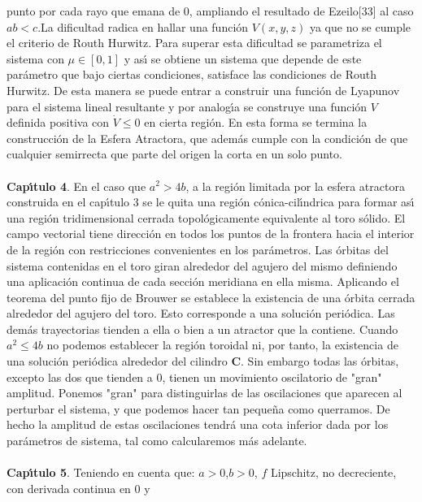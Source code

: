 \documentclass[letter]{article}
\begin{document}
punto por cada rayo que emana de 0, ampliando el resultado de
Ezeilo[33] al caso $ab<c$.La dificultad radica en hallar una
funci{\'o}n $V(x,y,z)$ ya que no se cumple el criterio de Routh
Hurwitz. Para superar esta dificultad se parametriza el sistema
con $\mu\in[0,1]$ y as{\'\i} se obtiene un sistema que depende de este
par{\'a}metro que bajo ciertas condiciones, satisface las condiciones
de Routh Hurwitz. De esta manera se puede entrar a construir una
funci{\'o}n de Lyapunov para el sistema lineal resultante y por
analog{\'\i}a se construye una funci{\'o}n $V$ definida positiva con
$\dot{V}\leq 0$ en cierta regi{\'o}n.  En esta forma  se termina la
construcci{\'o}n de la Esfera Atractora, que adem{\'a}s cumple con la
condici{\'o}n de que cualquier semirrecta que parte del origen la
corta en un solo punto.
\\
\\
{\bf Cap{\'\i}tulo 4}. En el caso que $a^2>4b$, a la regi{\'o}n limitada
por la esfera atractora \-construida en el cap{\'\i}tulo 3  se le quita
una regi{\'o}n c{\'o}nica-cil{\'\i}ndrica para formar as{\'\i} una regi{\'o}n
tridimensional cerrada topol{\'o}gicamente equivalente al toro s{\'o}lido.
El campo vectorial tiene direcci{\'o}n en todos los puntos de la
frontera hacia el interior de la regi{\'o}n con res\-tricciones
convenientes en los par{\'a}metros. Las {\'o}rbitas del sistema contenidas
en el toro giran alrededor del agujero del mismo definiendo una
aplicaci{\'o}n continua de cada secci{\'o}n meridiana en ella misma.
Aplicando el teorema del punto fijo de Brouwer se establece la
existencia de una {\'o}rbita cerrada alrededor del agujero del toro.
Esto corresponde a una soluci{\'o}n peri{\'o}dica. Las dem{\'a}s trayectorias
tienden a ella o bien a un atractor que la contiene. Cuando
$a^2\leq 4b$ no podemos establecer la regi{\'o}n toroidal ni, por
tanto, la existencia de una soluci{\'o}n peri{\'o}dica alrededor del
cilindro $\mathbf{C}$. Sin embargo todas las {\'o}rbitas, excepto las
dos que tienden a 0, tienen un movimiento oscilatorio de "gran"\-
amplitud. Ponemos "gran"\- para distinguirlas de las oscilaciones
que aparecen al perturbar el sistema, y que podemos hacer tan
peque{\~n}a como querramos. De hecho la amplitud de estas oscilaciones
tendr{\'a} una cota inferior dada por los par{\'a}metros de sistema, tal
como calcularemos m{\'a}s adelante.
\\
\\
{\bf Cap{\'\i}tulo 5}. Teniendo en cuenta que: $a>0$,\quad $b>0$, \quad
$f$ Lipschitz, no decreciente, con derivada continua en  0 y
\end{document}
